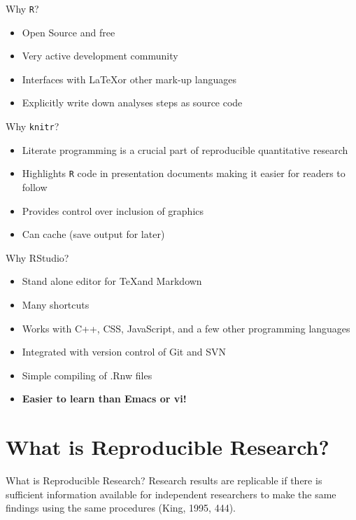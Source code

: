 \documentclass{beamer}\usepackage[]{graphicx}\usepackage[]{color}
\begin{document}
 \begin{frame}[t]{Why \texttt{R}?}
  \begin{itemize}
    \item Open Source and free
    \item Very active development community
    \item Interfaces with \LaTeX or other mark-up languages
    \item Explicitly write down analyses steps as source code
   \end{itemize}
 \end{frame}

 \begin{frame}[t]{Why \texttt{knitr}?}
  \begin{itemize}
    \item Literate programming is a crucial part of reproducible quantitative research
    \item Highlights \texttt{R} code in presentation documents making it easier for readers to follow
    \item Provides control over inclusion of graphics
    \item Can cache (save output for later)
   \end{itemize}
 \end{frame}

 \begin{frame}[t]{Why RStudio?}
  \begin{itemize}
    \item Stand alone editor for \TeX  and Markdown
    \item Many shortcuts
    \item Works with C++, CSS, JavaScript, and a few other programming languages
    \item Integrated with version control of Git and SVN
    \item Simple compiling of .Rnw files
    \item \textbf{Easier to learn than Emacs or vi!}
   \end{itemize}
 \end{frame}

\section{What is Reproducible Research?}

\begin{frame}[t]{What is Reproducible Research?}
     Research results are replicable if there is sufficient information available for independent researchers to make the same findings using the same procedures (King, 1995, 444). \\ \vspace{2cm}
  \end{frame}
\end{document}
